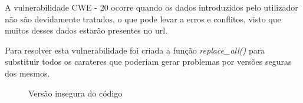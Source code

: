 \documentclass[12pt]{report}
\begin{document}
A vulnerabilidade CWE - 20 ocorre quando os dados introduzidos pelo utilizador não são devidamente tratados, o que pode levar a erros e conflitos, visto que muitos desses dados estarão presentes no url.\par
Para resolver esta vulnerabilidade foi criada a função \emph{replace\_all()} para substituir todos os carateres que poderiam gerar problemas por versões seguras dos mesmos.

\begin{figure}[H]{
\centering
{
\caption{Versão insegura do código}
}
}\end{figure}
\end{document}
